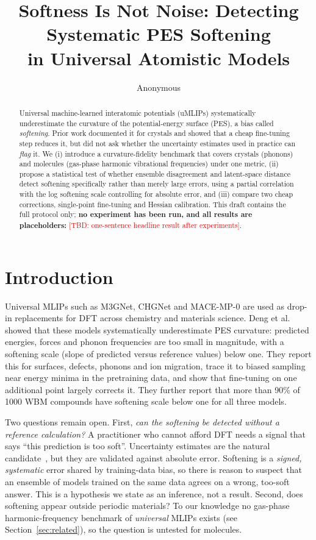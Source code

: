 \documentclass{article}
\title{Softness Is Not Noise: Detecting Systematic PES Softening\\in Universal Atomistic Models}
\author{Anonymous}
\newcommand{\TBD}[1]{\textcolor{red}{[TBD: #1]}}
\begin{document}
\maketitle

\begin{abstract}
Universal machine-learned interatomic potentials (uMLIPs) systematically underestimate the curvature of the potential-energy surface (PES), a bias called \emph{softening}. Prior work documented it for crystals and showed that a cheap fine-tuning step reduces it, but did not ask whether the uncertainty estimates used in practice can \emph{flag} it. We (i) introduce a curvature-fidelity benchmark that covers crystals (phonons) and molecules (gas-phase harmonic vibrational frequencies) under one metric, (ii) propose a statistical test of whether ensemble disagreement and latent-space distance detect softening specifically rather than merely large errors, using a partial correlation with the log softening scale controlling for absolute error, and (iii) compare two cheap corrections, single-point fine-tuning and Hessian calibration. This draft contains the full protocol only; \textbf{no experiment has been run, and all results are placeholders:} \TBD{one-sentence headline result after experiments}.
\end{abstract}

\section{Introduction}
Universal MLIPs such as M3GNet, CHGNet and MACE-MP-0 are used as drop-in replacements for DFT across chemistry and materials science. Deng et al.~\cite{deng2025softening} showed that these models systematically underestimate PES curvature: predicted energies, forces and phonon frequencies are too small in magnitude, with a softening scale (slope of predicted versus reference values) below one. They report this for surfaces, defects, phonons and ion migration, trace it to biased sampling near energy minima in the pretraining data, and show that fine-tuning on one additional point largely corrects it. They further report that more than 90\% of 1000 WBM compounds have softening scale below one for all three models.

Two questions remain open. First, \emph{can the softening be detected without a reference calculation?} A practitioner who cannot afford DFT needs a signal that says ``this prediction is too soft''. Uncertainty estimates are the natural candidate~\cite{hetero2025}, but they are validated against absolute error. Softening is a \emph{signed, systematic} error shared by training-data bias, so there is reason to suspect that an ensemble of models trained on the same data agrees on a wrong, too-soft answer. This is a hypothesis we state as an inference, not a result. Second, does softening appear outside periodic materials? To our knowledge no gas-phase harmonic-frequency benchmark of \emph{universal} MLIPs exists (see Section~\ref{sec:related}), so the question is untested for molecules.
\end{document}
